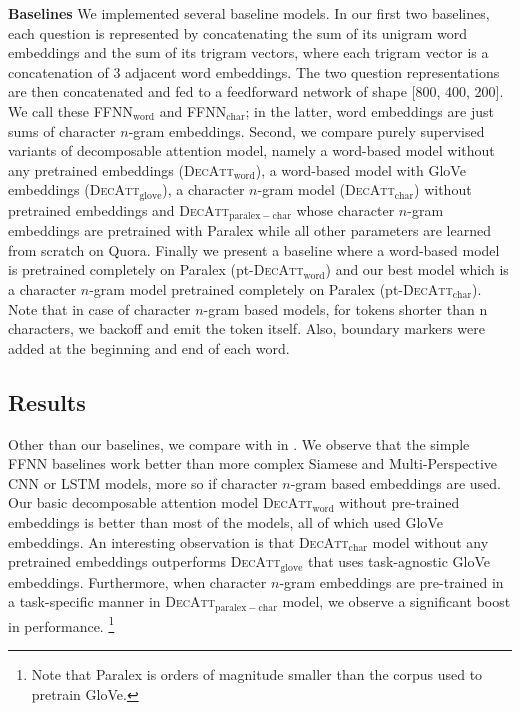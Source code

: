 \documentclass[11pt,letterpaper]{article}
\begin{document}
\noindent \textbf{Baselines} We implemented several baseline models.  In our first two baselines, each question is represented by concatenating the sum of its unigram word embeddings and the sum of its trigram vectors, where each trigram vector is a concatenation of 3 adjacent word embeddings.  The two question representations are then concatenated and fed to a feedforward network of shape [800, 400, 200].  We call these \textsc{FFNN}$_\mathrm{word}$ and \textsc{FFNN}$_\mathrm{char}$; in the latter, word embeddings are just sums of character $n$-gram embeddings.  Second, we compare purely supervised variants of decomposable attention model, namely a word-based model without any pretrained embeddings (\textsc{DecAtt}$_\mathrm{word}$), a word-based model with GloVe \cite{pennington2014glove} embeddings (\textsc{DecAtt}$_\mathrm{glove}$), a character $n$-gram model (\textsc{DecAtt}$_\mathrm{char}$)  without pretrained embeddings and \textsc{DecAtt}$_\mathrm{paralex-char}$ whose character $n$-gram embeddings are pretrained with Paralex while all other parameters are learned from scratch on Quora.  Finally we present a baseline where a word-based model is pretrained completely on Paralex (pt-\textsc{DecAtt}$_\mathrm{word}$) and our best model which is a character $n$-gram model pretrained completely on Paralex  (pt-\textsc{DecAtt}$_\mathrm{char}$). 
Note that in case of character $n$-gram based models, for tokens shorter than n characters, we backoff and emit the token itself. Also, boundary markers were added at the beginning and end of each word. 

\subsection{Results}
Other than our baselines, we compare with  in . We observe that the simple FFNN baselines work better than more complex Siamese and Multi-Perspective CNN or LSTM models, more so if character $n$-gram based embeddings are used. Our basic decomposable attention model \textsc{DecAtt}$_\mathrm{word}$ without pre-trained embeddings is better than most of the models, all of which used GloVe embeddings. An interesting observation is that  \textsc{DecAtt}$_\mathrm{char}$ model without any pretrained embeddings outperforms \textsc{DecAtt}$_\mathrm{glove}$ that uses task-agnostic GloVe embeddings. Furthermore, when character $n$-gram embeddings are pre-trained in a task-specific manner in \textsc{DecAtt}$_\mathrm{paralex-char}$ model, we observe a significant boost in performance. \footnote{Note that Paralex is orders of magnitude smaller than the corpus used to pretrain GloVe.}
\end{document}
